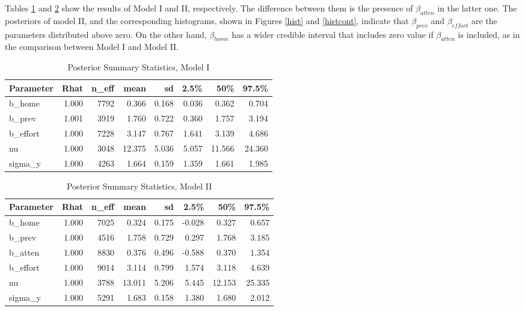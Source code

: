 \documentclass[]{article}
\begin{document}
Tables \ref{postmodelI} and \ref{postmodelII} show the results of Model I and II, respectively. The difference between them is the presence of $\beta_{atten}$ in the latter one.  The posteriors of model II, and the corresponding histograms, shown in Figures \ref{hist} and \ref{histcont}, indicate that $\beta_{prev}$ and $\beta_{effort}$ are the parameters distributed above zero. On the other hand, $\beta_{home}$ has a wider credible interval that includes zero value if $\beta_{atten}$ is included, as in the comparison between Model I and Model II. 

\begin{table}[ht]
	\centering
	\caption{Posterior Summary Statistics, Model I}
	\begin{tabular}{lrrrrrrr}
		\toprule
		Parameter & Rhat & n\_eff & mean & sd & 2.5\% & 50\% & 97.5\% \\ 
		\midrule
		b\_home & 1.000 & 7792 & 0.366 & 0.168 & 0.036 & 0.362 & 0.704 \\ 
		b\_prev & 1.001 & 3919 & 1.760 & 0.722 & 0.360 & 1.757 & 3.194 \\ 
		b\_effort & 1.000 & 7228 & 3.147 & 0.767 & 1.641 & 3.139 & 4.686 \\ 
		nu & 1.000 & 3048 & 12.375 & 5.036 & 5.057 & 11.566 & 24.360 \\ 
		sigma\_y & 1.000 & 4263 & 1.664 & 0.159 & 1.359 & 1.661 & 1.985 \\  
		\bottomrule
	\end{tabular}
	\label{postmodelI}
\end{table}

\begin{table}[ht]
	\centering
	\caption{Posterior Summary Statistics, Model II}
	\begin{tabular}{lrrrrrrr}
		\toprule
		Parameter & Rhat & n\_eff & mean & sd & 2.5\% & 50\% & 97.5\% \\ 
		\midrule
b\_home & 1.000 & 7025 & 0.324 & 0.175 & -0.028 & 0.327 & 0.657 \\ 
b\_prev & 1.000 & 4516 & 1.758 & 0.729 & 0.297 & 1.768 & 3.185 \\ 
b\_atten & 1.000 & 8830 & 0.376 & 0.496 & -0.588 & 0.370 & 1.354 \\ 
b\_effort & 1.000 & 9014 & 3.114 & 0.799 & 1.574 & 3.118 & 4.639 \\ 
nu & 1.000 & 3788 & 13.011 & 5.206 & 5.445 & 12.153 & 25.335 \\ 
sigma\_y & 1.000 & 5291 & 1.683 & 0.158 & 1.380 & 1.680 & 2.012 \\ 
		\bottomrule
	\end{tabular}
	\label{postmodelII}
\end{table}
\end{document}
